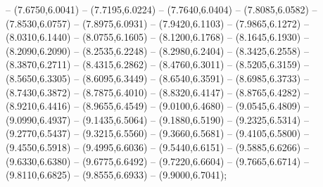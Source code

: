 {	-- (7.6750,6.0041)
	-- (7.7195,6.0224)
	-- (7.7640,6.0404)
	-- (7.8085,6.0582)
	-- (7.8530,6.0757)
	-- (7.8975,6.0931)
	-- (7.9420,6.1103)
	-- (7.9865,6.1272)
	-- (8.0310,6.1440)
	-- (8.0755,6.1605)
	-- (8.1200,6.1768)
	-- (8.1645,6.1930)
	-- (8.2090,6.2090)
	-- (8.2535,6.2248)
	-- (8.2980,6.2404)
	-- (8.3425,6.2558)
	-- (8.3870,6.2711)
	-- (8.4315,6.2862)
	-- (8.4760,6.3011)
	-- (8.5205,6.3159)
	-- (8.5650,6.3305)
	-- (8.6095,6.3449)
	-- (8.6540,6.3591)
	-- (8.6985,6.3733)
	-- (8.7430,6.3872)
	-- (8.7875,6.4010)
	-- (8.8320,6.4147)
	-- (8.8765,6.4282)
	-- (8.9210,6.4416)
	-- (8.9655,6.4549)
	-- (9.0100,6.4680)
	-- (9.0545,6.4809)
	-- (9.0990,6.4937)
	-- (9.1435,6.5064)
	-- (9.1880,6.5190)
	-- (9.2325,6.5314)
	-- (9.2770,6.5437)
	-- (9.3215,6.5560)
	-- (9.3660,6.5681)
	-- (9.4105,6.5800)
	-- (9.4550,6.5918)
	-- (9.4995,6.6036)
	-- (9.5440,6.6151)
	-- (9.5885,6.6266)
	-- (9.6330,6.6380)
	-- (9.6775,6.6492)
	-- (9.7220,6.6604)
	-- (9.7665,6.6714)
	-- (9.8110,6.6825)
	-- (9.8555,6.6933)
	-- (9.9000,6.7041);
}
